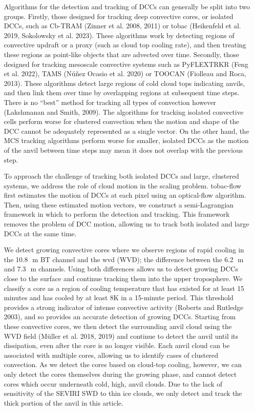 Algorithms for the detection and tracking of DCCs can generally be split
into two groups. Firstly, those designed for tracking deep convective
cores, or isolated DCCs, such as Cb-TRAM (Zinner et al. 2008, 2011) or
tobac (Heikenfeld et al. 2019, Sokolowsky et al. 2023). These algorithms
work by detecting regions of convective updraft or a proxy (such as
cloud top cooling rate), and then treating these regions as point-like
objects that are advected over time. Secondly, those designed for
tracking mesoscale convective systems such as PyFLEXTRKR (Feng et al.
2022), TAMS (Núñez Ocasio et al. 2020) or TOOCAN (Fiolleau and Roca,
2013). These algorithms detect large regions of cold cloud tops
indicating anvils, and then link them over time by overlapping regions
at subsequent time steps. There is no ``best'' method for tracking all
types of convection however (Lakshmanan and Smith, 2009). The algorithms
for tracking isolated convective cells perform worse for clustered
convection when the motion and shape of the DCC cannot be adequately
represented as a single vector. On the other hand, the MCS tracking
algorithms perform worse for smaller, isolated DCCs as the motion of the
anvil between time steps may mean it does not overlap with the previous
step.

To approach the challenge of tracking both isolated DCCs and large,
clustered systems, we address the role of cloud motion in the scaling
problem. tobac-flow first estimates the motion of DCCs at each pixel
using an optical-flow algorithm. Then, using these estimated motion
vectors, we construct a semi-Lagrangian framework in which to perform
the detection and tracking. This framework removes the problem of DCC
motion, allowing us to track both isolated and large DCCs at the same
time.

We detect growing convective cores where we observe regions of rapid
cooling in the 10.8\,\unit{\mu m} BT channel and the \acrshort{wvd} (WVD);
the difference between the 6.2\,\unit{\mu m} and 7.3\,\unit{\mu m} channels. Using both
differences allows us to detect growing DCCs close to the surface and
continue tracking them into the upper troposphere. We classify a core as
a region of cooling temperature that has existed for at least 15 minutes
and has cooled by at least 8K in a 15-minute period. This threshold
provides a strong indicator of intense convective activity (Roberts and
Rutledge 2003), and so provides an accurate detection of growing DCCs.
Starting from these convective cores, we then detect the surrounding
anvil cloud using the WVD field (Müller et al. 2018, 2019) and continue
to detect the anvil until its dissipation, even after the core is no
longer visible. Each anvil cloud can be associated with multiple cores,
allowing us to identify cases of clustered convection. As we detect the
cores based on cloud-top cooling, however, we can only detect the cores
themselves during the growing phase, and cannot detect cores which occur
underneath cold, high, anvil clouds. Due to the lack of sensitivity of
the SEVIRI SWD to thin ice clouds, we only detect and track the thick
portion of the anvil in this article.

